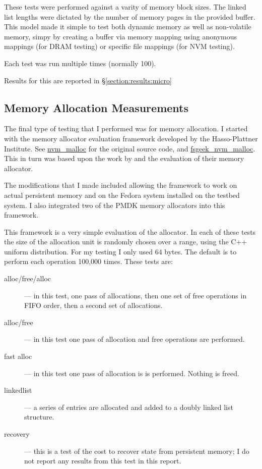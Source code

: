 These tests were performed against a varity of memory block sizes.  The linked list lengths were dictated by the number of memory pages in the provided buffer.  This model made it simple to test both dynamic memory as well as non-volatile memory, simpy by creating a buffer via memory mapping using anonymous mappings (for DRAM testing) or specific file mappings (for NVM testing).

Each test was run multiple times (normally 100).

Results for this are reported in \S \ref{section:results:micro}

\subsection{Memory Allocation Measurements}\label{section:model:methodology:malloc}

The final type of testing that I performed was for memory allocation.  I started with the memory allocator evaluation framework developed by the Hasso-Plattner Institute. See \href{https://github.com/hyrise/nvm\_malloc}{nvm\_malloc} for the original source code, and \href{https://github.com/fsgeek/nvm\_malloc}{fsgeek\_nvm\_malloc}.  This in turn was based upon the work by \cite{schwalb2015nvm} and the evaluation of their memory allocator.

The modifications that I made included allowing the framework to work on actual persistent memory and on the Fedora system installed on the testbed system.  I also integrated two of the \acs{PMDK} memory allocators into this framework.

This framework is a very simple evaluation of the allocator.  In each of these tests the size of the allocation unit is randomly chosen over a range, using the C++ uniform distribution.  For my testing I only used 64 bytes.  The default is to perform each operation 100,000 times. These tests are:

\begin{description}
    \item[alloc/free/alloc] --- in this test, one pass of allocations, then one set of free operations in FIFO order, then a second set of allocations.
    \item[alloc/free] --- in this test one pass of allocation and free operations are performed.
    \item[fast alloc] --- in this test one pass of allocation is is performed.  Nothing is freed.
    \item[linkedlist] --- a series of entries are allocated and added to a doubly linked list structure.
    \item[recovery] --- this is a test of the cost to recover state from persistent memory; I do not report any results from this test in this report. 
\end{description}


